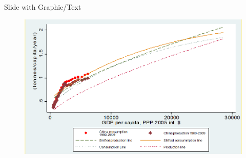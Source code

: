 \documentclass[newPxFont]{beamer}
\begin{document}
\begin{frame}[c]{Slide with Graphic/Text}
\begin{figure}
	\centering
	\includegraphics[width=0.65\linewidth]{Importer.png}
\end{figure}
\end{frame}
\end{document}
